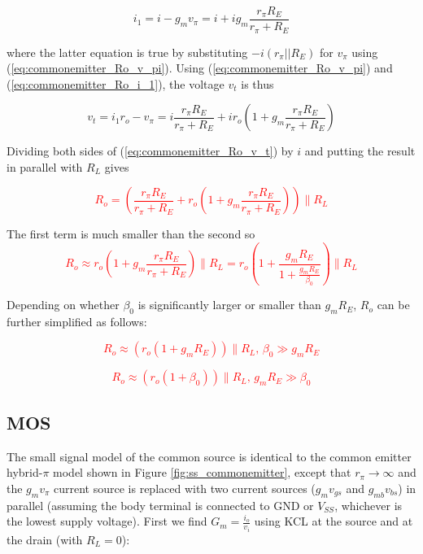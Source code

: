 \begin{equation}
i_{1} = i - g_{m}v_{\pi} = i + ig_{m}\frac{r_{\pi}R_{E}}{r_{\pi}+R_{E}}
\label{eq:commonemitter_Ro_i_1}
\end{equation}

\noindent where the latter equation is true by substituting $-i(r_{\pi}||R_{E})$ for $v_{\pi}$ using (\ref{eq:commonemitter_Ro_v_pi}). Using (\ref{eq:commonemitter_Ro_v_pi}) and (\ref{eq:commonemitter_Ro_i_1}), the voltage $v_{t}$ is thus

\begin{equation}
v_{t} = i_{1}r_{o}-v_{\pi} = i\frac{r_{\pi}R_{E}}{r_{\pi}+R_{E}} + ir_{o}\left(1+g_{m}\frac{r_{\pi}R_{E}}{r_{\pi}+R_{E}}\right)
\label{eq:commonemitter_Ro_v_t}
\end{equation}

\noindent Dividing both sides of (\ref{eq:commonemitter_Ro_v_t}) by $i$ and putting the result in parallel with $R_{L}$ gives \autocite[200]{analysis-design-analog-ics}

\textcolor{red}{
\begin{equation}
R_{o} = \left(\frac{r_{\pi}R_{E}}{r_{\pi}+R_{E}} + r_{o}\left(1+g_{m}\frac{r_{\pi}R_{E}}{r_{\pi}+R_{E}}\right)\right) \parallel R_{L}
\label{eq:commonemitter_Ro}
\end{equation}
}

The first term is much smaller than the second so
\textcolor{red}{
\begin{equation}
R_{o} \approx r_{o}\left(1+g_{m}\frac{r_{\pi}R_{E}}{r_{\pi}+R_{E}}\right) \parallel R_{L} = r_{o}\left(1+\frac{g_{m}R_{E}}{1+\frac{g_{m}R_{E}}{\beta_{0}}}\right) \parallel R_{L}
\end{equation}
}

Depending on whether $\beta_{0}$ is significantly larger or smaller than $g_{m}R_{E}$, $R_{o}$ can be further simplified as follows:

\textcolor{red}{
\begin{equation}
R_{o} \approx (r_{o}(1+g_{m}R_{E})) \parallel R_{L}\text{, }\beta_{0} \gg g_{m}R_{E}
\end{equation}
}

\textcolor{red}{
\begin{equation}
R_{o} \approx (r_{o}(1+\beta_{0})) \parallel R_{L}\text{, }g_{m}R_{E} \gg \beta_{0}
\end{equation}
}

\subsection{MOS}
The small signal model of the common source is identical to the common emitter hybrid-$\pi$ model shown in Figure \ref{fig:ss_commonemitter}, except that $r_{\pi} \rightarrow \infty$ and the $g_{m}v_{\pi}$ current source is replaced with two current sources ($g_{m}v_{gs}$ and $g_{mb}v_{bs}$) in parallel (assuming the body terminal is connected to GND or $V_{SS}$, whichever is the lowest supply voltage). First we find $G_{m} = \frac{i_{o}}{v_{i}}$ using KCL at the source and at the drain (with $R_{L} = 0$):

